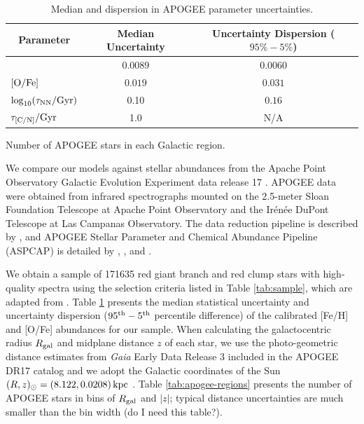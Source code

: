 \documentclass[twocolumn,twocolappendix,linenumbers]{aastex631}
\newcommand{\todo}[1]{{\color{red}#1}}
\newcommand{\mathOFe}{{\rm [O/Fe]}}
\begin{document}
\begin{table}
    \centering
    \caption{Median and dispersion in APOGEE parameter uncertainties.}
    \label{tab:uncertainties}
    \begin{tabular}{lcc}
        \hline\hline
        \multicolumn{1}{c}{Parameter} & \multicolumn{1}{c}{Median Uncertainty} & \multicolumn{1}{c}{Uncertainty Dispersion ($95\%-5\%$)} \\
        \hline
        [Fe/H]          & $0.0089$   & $0.0060$ \\
        $\mathOFe$  & $0.019$    & $0.031$ \\
        $\log_{10}(\tau_{\rm NN}/{\rm Gyr})$    & 0.10   & $0.16$ \\
        $\tau_{\rm [C/N]}/{\rm Gyr}$     & 1.0   & \todo{N/A} \\
        \hline
    \end{tabular}
\end{table}

\begin{table}
\centering
\caption{Number of APOGEE stars in each Galactic region.}
\label{tab:apogee-regions}

\end{table}

We compare our models against stellar abundances from the Apache Point Observatory Galactic Evolution Experiment \citep[APOGEE;][]{majewski_apache_2017} data release 17 \citep[DR17;][]{abdurrouf_seventeenth_2022}. APOGEE data were obtained from infrared spectrographs \citep{wilson_apache_2019} mounted on the 2.5-meter Sloan Foundation Telescope \citep{gunn_25_2006} at Apache Point Observatory and the Ir{\'e}n{\'e}e DuPont Telescope \citep{bowen_optical_1973} at Las Campanas Observatory. The data reduction pipeline is described by \citet{nidever_data_2015}, and APOGEE Stellar Parameter and Chemical Abundance Pipeline (ASPCAP) is detailed by \citet{holtzman_abundances_2015}, \citet{garcia_perez_aspcap_2016}, and \citet{jonsson_apogee_2020}.

We obtain a sample of \num{171635} red giant branch and red clump stars with high-quality spectra using the selection criteria listed in Table \ref{tab:sample}, which are adapted from \citet{hayden_chemical_2015}. Table \ref{tab:uncertainties} presents the median statistical uncertainty and uncertainty dispersion ($95^{\rm th} - 5^{\rm th}$ percentile difference) of the calibrated [Fe/H] and [O/Fe] abundances for our sample. When calculating the galactocentric radius $R_{\rm gal}$ and midplane distance $z$ of each star, we use the \citet{bailer-jones_estimating_2021} photo-geometric distance estimates from {\it Gaia} Early Data Release 3 \citep{gaia_collaboration_gaia_2016,gaia_collaboration_gaia_2021} included in the APOGEE DR17 catalog and we adopt the Galactic coordinates of the Sun $(R,z)_\odot=(8.122, 0.0208)\,{\rm kpc}$ \citep{gravity_collaboration_detection_2018,bennett_vertical_2019}. Table \ref{tab:apogee-regions} presents the number of APOGEE stars in bins of $R_{\rm gal}$ and $|z|$; typical distance uncertainties are much smaller than the bin width \todo{(do I need this table?)}.
\end{document}
